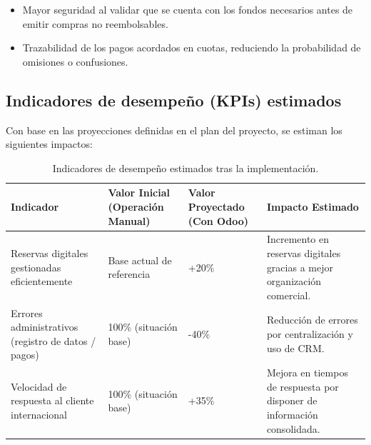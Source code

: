 \begin{itemize}
    \item Mayor seguridad al validar que se cuenta con los fondos necesarios antes de emitir compras no reembolsables.
    \item Trazabilidad de los pagos acordados en cuotas, reduciendo la probabilidad de omisiones o confusiones.
\end{itemize}

\subsection{Indicadores de desempeño (KPIs) estimados}

Con base en las proyecciones definidas en el plan del proyecto, se estiman los siguientes impactos:

\begin{table}[h]
\centering
\footnotesize
\renewcommand{\arraystretch}{1.5}
\begin{tabular}{|p{3cm}|p{3cm}|p{3cm}|p{3cm}|}
\hline
\textbf{Indicador} & \textbf{Valor Inicial (Operación Manual)} & \textbf{Valor Proyectado (Con Odoo)} & \textbf{Impacto Estimado} \\ \hline
Reservas digitales gestionadas eficientemente & Base actual de referencia & +20\% & Incremento en reservas digitales gracias a mejor organización comercial. \\ \hline
Errores administrativos (registro de datos / pagos) & 100\% (situación base) & -40\% & Reducción de errores por centralización y uso de CRM. \\ \hline
Velocidad de respuesta al cliente internacional & 100\% (situación base) & +35\% & Mejora en tiempos de respuesta por disponer de información consolidada. \\ \hline
\end{tabular}
\caption{Indicadores de desempeño estimados tras la implementación.}
\end{table}

